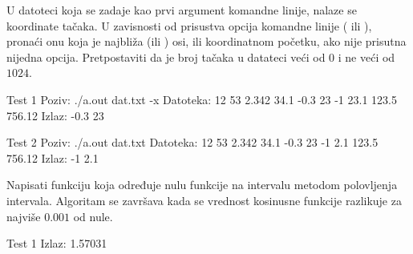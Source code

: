 \begin{Answer}[ref=404]
\end{Answer}
\begin{Exercise}[label=405]
  U datoteci koja se zadaje kao prvi argument komandne linije, nalaze
  se koordinate tačaka. U zavisnosti od prisustva opcija komandne
  linije ( ili ), pronaći onu koja je najbliža
   (ili ) osi, ili koordinatnom početku, ako nije
  prisutna nijedna opcija. Pretpostaviti da je broj tačaka u datateci
  veći od $0$ i ne veći od $1024$.
  
\begin{miditest}
\begin{test}{Test 1}
Poziv: ./a.out dat.txt -x
Datoteka:
  12 53
  2.342 34.1
  -0.3 23
  -1 23.1
  123.5 756.12
Izlaz: -0.3 23
\end{test}
\end{miditest}
\begin{miditest}
\begin{test}{Test 2}
Poziv: ./a.out dat.txt 
Datoteka:
  12 53
  2.342 34.1
  -0.3 23
  -1 2.1
  123.5 756.12
Izlaz: -1 2.1
\end{test}
\end{miditest}


\end{Exercise}

\begin{Answer}[ref=405]
\end{Answer}
\begin{Exercise}[label=406]
  Napisati funkciju koja određuje nulu funkcije  na
  intervalu \argf{[0,2]} metodom polovljenja intervala. Algoritam se
  završava kada se vrednost kosinusne funkcije razlikuje za najviše
  $0.001$ od nule. 
  
\begin{minitest}
\begin{test}{Test 1}
Izlaz: 1.57031
\end{test}
\end{minitest}


\end{Exercise}

